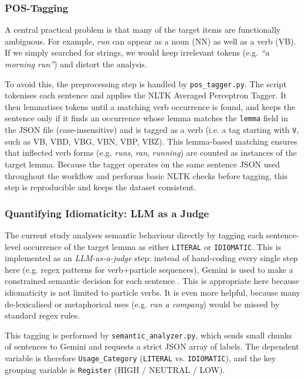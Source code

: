 \subsubsection{POS-Tagging}
A central practical problem is that many of the target items are functionally ambiguous. For example, \textit{run} can appear as a noun (NN) as well as a verb (VB). If we simply searched for strings, we would keep irrelevant tokens (e.g. \textit{``a morning run''}) and distort the analysis.

To avoid this, the preprocessing step is handled by \texttt{pos\_tagger.py}. The script tokenises each sentence and applies the NLTK Averaged Perceptron Tagger. It then lemmatises tokens until a matching verb occurrence is found, and keeps the sentence only if it finds an occurrence whose lemma matches the \texttt{lemma} field in the JSON file (case-insensitive) and is tagged as a verb (i.e. a tag starting with \texttt{V}, such as VB, VBD, VBG, VBN, VBP, VBZ). This lemma-based matching ensures that inflected verb forms (e.g. \textit{runs}, \textit{ran}, \textit{running}) are counted as instances of the target lemma. Because the tagger operates on the same sentence JSON used throughout the workflow and performs basic NLTK checks before tagging, this step is reproducible and keeps the dataset consistent.

\subsubsection{Quantifying Idiomaticity: LLM as a Judge}
The current study analyses semantic behaviour directly by tagging each sentence-level occurrence of the target lemma as either \texttt{LITERAL} or \texttt{IDIOMATIC}. This is implemented as an \textit{LLM-as-a-judge} step: instead of hand-coding every single step here (e.g. regex patterns for verb+particle sequences), Gemini is used to make a constrained semantic decision for each sentence \parencite{zhengJudgingLLMas2023}. This is appropriate here because idiomaticity is not limited to particle verbs. It is even more helpful, because many de-lexicalised or metaphorical uses (e.g. \textit{run a company}) would be missed by standard regex rules.

This tagging is performed by \texttt{semantic\_analyzer.py}, which sends small chunks of sentences to Gemini and requests a strict JSON array of labels. The dependent variable is therefore \texttt{Usage\_Category} (\texttt{LITERAL} vs. \texttt{IDIOMATIC}), and the key grouping variable is \texttt{Register} (HIGH / NEUTRAL / LOW).

